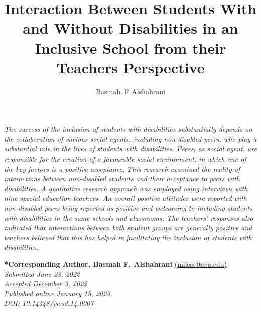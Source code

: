 \documentclass[11pt]{sig-alternate}
\makeatletter
\let\oldabstract\abstract
\let\oldendabstract\endabstract
\renewenvironment{abstract}
{\renewenvironment{quotation}%
               {\list{}{\addtolength{\leftmargin}{1em} %
                        \listparindent 1.5em%
                        \itemindent    \listparindent%
                        \rightmargin   \leftmargin%
                        \parsep        \z@ \@plus\p@}%
                \item\relax}%
               {\endlist}%
\oldabstract}
{\oldendabstract}
\makeatother
\begin{document}
\title{Interaction Between Students With and Without Disabilities in an Inclusive School from their Teachers Perspective}

\author[1]{\large \color{blue} Basmah. F Alshahrani}


\toappear{}

\maketitle
\begin{@twocolumnfalse} 

\begin{abstract}
     \textit{The success of the inclusion of students with disabilities substantially depends on the collaboration of various social agents, including non-disabled peers, who play a substantial role in the lives of students with disabilities. Peers, as social agent, are responsible for the creation of a favourable social environment, in which one of the key factors is a positive acceptance. This research examined the reality of interactions between non-disabled students and their acceptance to peers with disabilities. A qualitative research approach was employed using interviews with nine special education teachers. An overall positive attitudes were reported with non-disabled peers being reported as positive and welcoming to including students with disabilities in the same schools and classrooms. The teachers’ responses also indicated that interactions between both student groups are generally positive and teachers believed that this has helped in facilitating the inclusion of students with disabilities. }
\end{abstract}
\end{@twocolumnfalse}




\textbf{*Corresponding Author, Basmah F. Alshahrani} \href{mailto:bsmh@kku.edu.sa}{(milesr@ecu.edu)} \\
\textit{Submitted June 23, 2022 }\\
\textit{Accepted December 3, 2022} \\
\textit{Published online January 15, 2023} \\
\textit{DOI: 10.14448/jsesd.14.0007} \\


\pagebreak
\pagebreak
\end{document}
